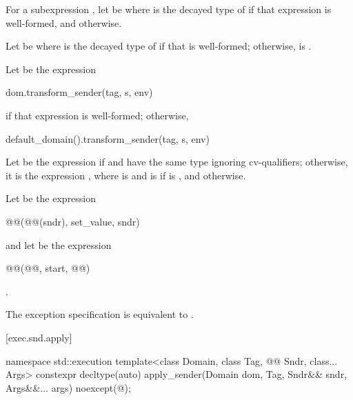 \begin{itemdescr}
\pnum
For a subexpression ,
let  be
 where  is the decayed type of 
if that expression is well-formed, and
 otherwise.

\pnum
Let  be
 where  is the decayed type of
if that is well-formed;
otherwise,  is .

\pnum
Let  be the expression
\begin{codeblock}
dom.transform_sender(tag, s, env)
\end{codeblock}
if that expression is well-formed; otherwise,
\begin{codeblock}
default_domain().transform_sender(tag, s, env)
\end{codeblock}
Let  be
the expression 
if\newline {} and 
have the same type ignoring cv-qualifiers;
otherwise, it is
the expression , where
 is  and
 is  if  is , and
 otherwise.

Let  be the expression
\begin{codeblock}
@@(@@(sndr), set_value, sndr)
\end{codeblock}
and let  be the expression
\begin{codeblock}
@@(@@, start, @@)
\end{codeblock}

\pnum
\returns
{}.

\pnum
\remarks
The exception specification is equivalent to
.
\end{itemdescr}

[exec.snd.apply]{}

%
\begin{itemdecl}
namespace std::execution {
  template<class Domain, class Tag, @@ Sndr, class... Args>
    constexpr decltype(auto) apply_sender(Domain dom, Tag, Sndr&& sndr, Args&&... args)
      noexcept(@\seebelow@);
}
\end{itemdecl}

